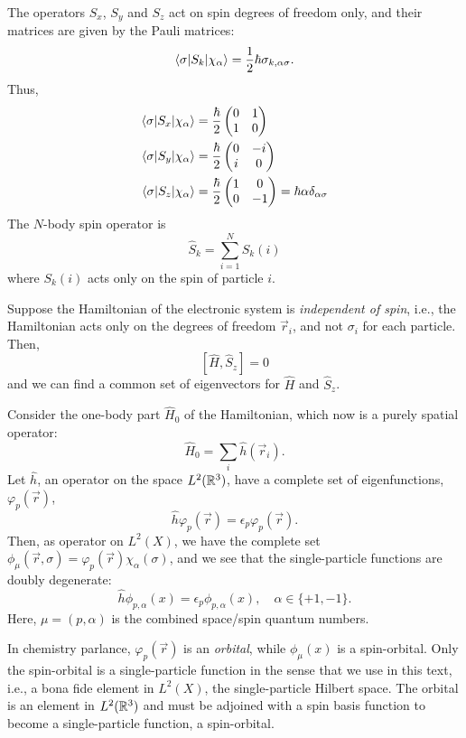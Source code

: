 \documentclass{report}
\theoremstyle{plain}
\theoremstyle{definition}
\begin{document}
The operators $S_x$, $S_y$ and $S_z$ act on spin degrees of freedom
only, and their matrices are given by the Pauli matrices:
\[ \braket{\sigma|S_k|\chi_\alpha} = \frac{1}{2}\hbar
\sigma_{k,\alpha\sigma}. \]
Thus,
\begin{align}
 \braket{\sigma|S_x|\chi_\alpha} &= \frac{\hbar}{2}\begin{pmatrix} 0 & 1
  \\ 1 & 0 \end{pmatrix}  \\
 \braket{\sigma|S_y|\chi_\alpha} &= \frac{\hbar}{2}\begin{pmatrix} 0 & -i
  \\ i & 0 \end{pmatrix}  \\
 \braket{\sigma|S_z|\chi_\alpha} &= \frac{\hbar}{2}\begin{pmatrix} 1 & 0
  \\ 0 & -1 \end{pmatrix} = \hbar\alpha\delta_{\alpha\sigma}
\end{align}
The $N$-body spin operator is
\begin{equation}
  \hat{S}_k = \sum_{i=1}^N S_k(i)
\end{equation}
where $S_k(i)$ acts only on the spin of particle $i$.

Suppose the Hamiltonian of the electronic system is \emph{independent
  of spin}, i.e., the Hamiltonian acts only on the degrees of freedom
$\vec{r}_i$, and not $\sigma_i$ for each particle. Then,
\[ [\hat{H}, \hat{S}_z] = 0 \]
and we can find a common set of eigenvectors for $\hat{H}$ and $\hat{S}_z$.

Consider the one-body part $\hat{H}_0$ of the Hamiltonian, which now
is a purely spatial operator:
\begin{equation}
  \hat{H}_0 = \sum_i \hat{h}(\vec{r}_i).
\end{equation}
Let $\hat{h}$, an operator on the space $L^2(\mathbb{R}^3)$, have a complete set of eigenfunctions,
$\varphi_p(\vec{r})$,
\[ \hat{h}\varphi_p(\vec{r}) = \epsilon_p \varphi_p(\vec{r}).\]
Then, as operator on $L^2(X)$, we have the
complete set $\phi_\mu(\vec{r},\sigma) =
\varphi_p(\vec{r})\chi_\alpha(\sigma)$, and we see that the
single-particle functions are doubly degenerate:
\[ \hat{h}\phi_{p,\alpha}(x) = \epsilon_p \phi_{p,\alpha}(x), \quad
\alpha \in \{+1,-1\}. \]
Here, $\mu = (p,\alpha)$ is the combined space/spin quantum numbers. 

In chemistry parlance, $\varphi_p(\vec{r})$ is an \emph{orbital},
while $\phi_\mu(x)$ is a spin-orbital. Only the spin-orbital is a
single-particle function in the sense that we use in this text, i.e.,
a bona fide element in $L^2(X)$, the single-particle Hilbert
space. The orbital is an element in $L^2(\mathbb{R}^3)$ and must be adjoined
with a spin basis function to become a single-particle function, a
spin-orbital. 
\end{document}
